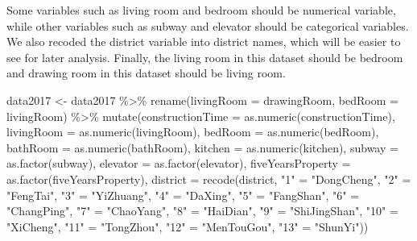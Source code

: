 \documentclass[
]{article}
\newenvironment{Shaded}{\begin{snugshade}}{\end{snugshade}}
\newcommand{\AttributeTok}[1]{\textcolor[rgb]{0.77,0.63,0.00}{#1}}
\newcommand{\FunctionTok}[1]{\textcolor[rgb]{0.00,0.00,0.00}{#1}}
\newcommand{\NormalTok}[1]{#1}
\newcommand{\OtherTok}[1]{\textcolor[rgb]{0.56,0.35,0.01}{#1}}
\newcommand{\SpecialCharTok}[1]{\textcolor[rgb]{0.00,0.00,0.00}{#1}}
\newcommand{\StringTok}[1]{\textcolor[rgb]{0.31,0.60,0.02}{#1}}
\begin{document}
Some variables such as living room and bedroom should be numerical
variable, while other variables such as subway and elevator should be
categorical variables. We also recoded the district variable into
district names, which will be easier to see for later analysis. Finally,
the living room in this dataset should be bedroom and drawing room in
this dataset should be living room.

\begin{Shaded}
\begin{Highlighting}[]
\NormalTok{data2017 }\OtherTok{\textless{}{-}}\NormalTok{ data2017 }\SpecialCharTok{\%\textgreater{}\%} 
  \FunctionTok{rename}\NormalTok{(}\AttributeTok{livingRoom =}\NormalTok{ drawingRoom, }\AttributeTok{bedRoom =}\NormalTok{ livingRoom) }\SpecialCharTok{\%\textgreater{}\%}
  \FunctionTok{mutate}\NormalTok{(}\AttributeTok{constructionTime =} \FunctionTok{as.numeric}\NormalTok{(constructionTime), }
         \AttributeTok{livingRoom =} \FunctionTok{as.numeric}\NormalTok{(livingRoom),}
         \AttributeTok{bedRoom =} \FunctionTok{as.numeric}\NormalTok{(bedRoom),}
         \AttributeTok{bathRoom =} \FunctionTok{as.numeric}\NormalTok{(bathRoom),}
         \AttributeTok{kitchen =} \FunctionTok{as.numeric}\NormalTok{(kitchen),}
         \AttributeTok{subway =} \FunctionTok{as.factor}\NormalTok{(subway),}
         \AttributeTok{elevator =} \FunctionTok{as.factor}\NormalTok{(elevator),}
         \AttributeTok{fiveYearsProperty =} \FunctionTok{as.factor}\NormalTok{(fiveYearsProperty),}
         \AttributeTok{district =} \FunctionTok{recode}\NormalTok{(district, }\StringTok{"1"} \OtherTok{=} \StringTok{"DongCheng"}\NormalTok{,}
                           \StringTok{"2"} \OtherTok{=} \StringTok{"FengTai"}\NormalTok{, }\StringTok{"3"} \OtherTok{=} \StringTok{"YiZhuang"}\NormalTok{, }\StringTok{"4"} \OtherTok{=} \StringTok{"DaXing"}\NormalTok{, }
                           \StringTok{"5"} \OtherTok{=} \StringTok{"FangShan"}\NormalTok{, }\StringTok{"6"} \OtherTok{=} \StringTok{"ChangPing"}\NormalTok{, }\StringTok{"7"} \OtherTok{=} \StringTok{"ChaoYang"}\NormalTok{,}
                           \StringTok{"8"} \OtherTok{=} \StringTok{"HaiDian"}\NormalTok{, }\StringTok{"9"} \OtherTok{=} \StringTok{"ShiJingShan"}\NormalTok{, }\StringTok{"10"} \OtherTok{=} \StringTok{"XiCheng"}\NormalTok{, }
                           \StringTok{"11"} \OtherTok{=} \StringTok{"TongZhou"}\NormalTok{, }\StringTok{"12"} \OtherTok{=} \StringTok{"MenTouGou"}\NormalTok{, }\StringTok{"13"} \OtherTok{=} \StringTok{"ShunYi"}\NormalTok{))}
\end{Highlighting}
\end{Shaded}
\end{document}

